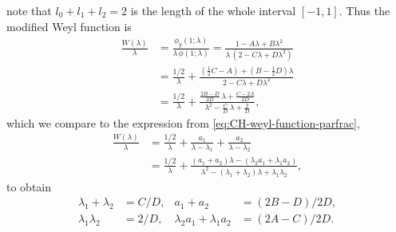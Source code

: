 \documentclass[10pt,a4paper]{article} \pdfoutput=1 
\begin{document}
\begin{example}
  note that $l_0 + l_1 + l_2 = 2$ is the length of the whole
  interval $[-1,1]$.
  Thus the modified Weyl function is
  \begin{equation*}
    \begin{split}
      \frac{W(\lambda)}{\lambda}
      &
      = \frac{\phi_y(1;\lambda)}{\lambda \, \phi(1;\lambda)}
      = \frac{1 - A \lambda + B \lambda^2}{\lambda \, (2 - C \lambda + D \lambda^2)}
      \\ &
      = \frac{1/2}{\lambda}
        + \frac{(\tfrac12 C - A) + (B - \tfrac12 D) \lambda}{2 - C \lambda + D \lambda^2}
      \\ &
      = \frac{1/2}{\lambda}
        + \frac{\frac{2B-D}{2D} \, \lambda + \frac{C-2A}{2D}}{\lambda^2 - \frac{C}{D} \, \lambda + \frac{2}{D}}
      ,
    \end{split}
  \end{equation*}
  which we compare to the expression from \eqref{eq:CH-weyl-function-parfrac},
  \begin{equation*}
    \begin{split}
      \frac{W(\lambda)}{\lambda}
      &
      = \frac{1/2}{\lambda} + \frac{a_1}{\lambda - \lambda_1} + \frac{a_2}{\lambda - \lambda_2}
      \\ &
      = \frac{1/2}{\lambda}
        + \frac{(a_1 + a_2) \lambda - (\lambda_2 a_1 + \lambda_1 a_2)}{\lambda^2 - (\lambda_1 + \lambda_2) \lambda + \lambda_1 \lambda_2}
      ,
    \end{split}
  \end{equation*}
  to obtain
  \begin{equation}
    \label{eq:CH-two-masses-forward-inverse-problem}
    \begin{aligned}
      \lambda_1 + \lambda_2 &= C/D
      ,&
      a_1 + a_2 &= (2B-D)/2D
      ,\\
      \lambda_1 \lambda_2 &= 2/D
      ,&
      \lambda_2 a_1 + \lambda_1 a_2 &= (2A-C)/2D
      .
    \end{aligned}
  \end{equation}


\end{example}
\end{document}
